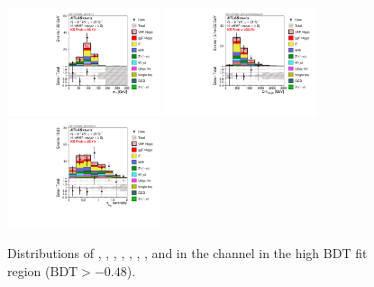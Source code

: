 \begin{figure}[h!]
   \includegraphics[width=0.4\textwidth]{fig/analysis/BDTinputVarsInSR/DF_SR_FitRegion_MT_tr_mh125_lin.pdf}
   \includegraphics[width=0.4\textwidth]{fig/analysis/BDTinputVarsInSR/DF_SR_FitRegion_SumOFMvaMLepxJety_mh125_lin.pdf}
   \includegraphics[width=0.4\textwidth]{fig/analysis/BDTinputVarsInSR/DF_SR_FitRegion_contOLV_mh125_lin.pdf}
   \caption{Distributions
   of \dphill, \mll, \dyjj, \mjj, \pTtot, \mT, \SumMlj, and
   \lepEtaCent
   in the \emme channel in the high BDT fit region ($\textrm{BDT} > -0.48$).}
  \label{chap:analysis:fig:bdt_inputs_sr_df}
\end{figure}

